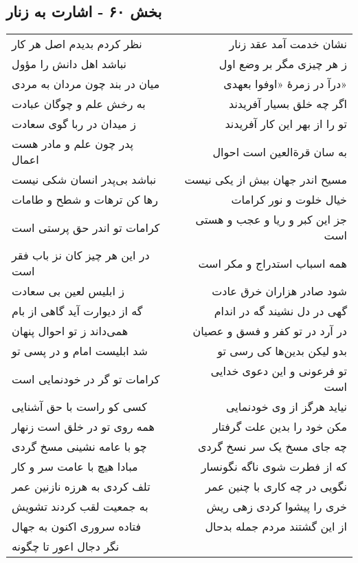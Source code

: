 \begin{center}
\section*{بخش ۶۰ - اشارت به زنار}
\label{sec:sh060}
\begin{longtable}{l p{0.5cm} r}
نظر کردم بدیدم اصل هر کار
&&
نشان خدمت آمد عقد زنار
\\
نباشد اهل دانش را مؤول
&&
ز هر چیزی مگر بر وضع اول
\\
میان در بند چون مردان به مردی
&&
درآ در زمرهٔ «اوفوا بعهدی»
\\
به رخش علم و چوگان عبادت
&&
اگر چه خلق بسیار آفریدند
\\
ز میدان در ربا گوی سعادت
&&
تو را از بهر این کار آفریدند
\\
پدر چون علم و مادر هست اعمال
&&
به سان قرةالعین است احوال
\\
نباشد بی‌پدر انسان شکی نیست
&&
مسیح اندر جهان بیش از یکی نیست
\\
رها کن ترهات و شطح و طامات
&&
خیال خلوت و نور کرامات
\\
کرامات تو اندر حق پرستی است
&&
جز این کبر و ریا و عجب و هستی است
\\
در این هر چیز کان نز باب فقر است
&&
همه اسباب استدراج و مکر است
\\
ز ابلیس لعین بی سعادت
&&
شود صادر هزاران خرق عادت
\\
گه از دیوارت آید گاهی از بام
&&
گهی در دل نشیند گه در اندام
\\
همی‌داند ز تو احوال پنهان
&&
در آرد در تو کفر و فسق و عصیان
\\
شد ابلیست امام و در پسی تو
&&
بدو لیکن بدین‌ها کی رسی تو
\\
کرامات تو گر در خودنمایی است
&&
تو فرعونی و این دعوی خدایی است
\\
کسی کو راست با حق آشنایی
&&
نیاید هرگز از وی خودنمایی
\\
همه روی تو در خلق است زنهار
&&
مکن خود را بدین علت گرفتار
\\
چو با عامه نشینی مسخ گردی
&&
چه جای مسخ یک سر نسخ گردی
\\
مبادا هیچ با عامت سر و کار
&&
که از فطرت شوی ناگه نگونسار
\\
تلف کردی به هرزه نازنین عمر
&&
نگویی در چه کاری با چنین عمر
\\
به جمعیت لقب کردند تشویش
&&
خری را پیشوا کردی زهی ریش
\\
فتاده سروری اکنون به جهال
&&
از این گشتند مردم جمله بدحال
\\
نگر دجال اعور تا چگونه

\end{longtable}
\end{center}
